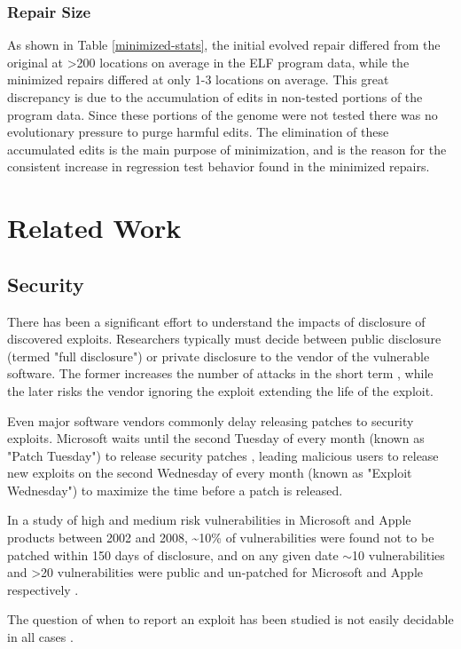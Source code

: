 \documentclass{sigcomm-alternate}
\begin{document}
\subsubsection{Repair Size}
\label{sec-4-2-3}
As shown in Table \ref{minimized-stats}, the initial evolved repair differed
from the original at >200 locations on average in the ELF program
data, while the minimized repairs differed at only 1-3 locations on
average.  This great discrepancy is due to the accumulation of edits
in non-tested portions of the program data.  Since these portions of
the genome were not tested there was no evolutionary pressure to purge
harmful edits.  The elimination of these accumulated edits is the main
purpose of minimization, and is the reason for the consistent increase
in regression test behavior found in the minimized repairs.
\section{Related Work}
\label{sec-5}
\subsection{Security}
\label{sec-5-1}
There has been a significant effort to understand the impacts of
disclosure of discovered exploits.  Researchers typically must decide
between public disclosure (termed "full disclosure") or private
disclosure to the vendor of the vulnerable software.  The former
increases the number of attacks in the short term \cite{arora2006does},
while the later risks the vendor ignoring the exploit extending the
life of the exploit.

Even major software vendors commonly delay releasing patches to
security exploits.  Microsoft waits until the second Tuesday of every
month (known as "Patch Tuesday") to release security patches
\cite{lemos2003microsoft}, leading malicious users to release new
exploits on the second Wednesday of every month (known as "Exploit
Wednesday") to maximize the time before a patch is released.

In a study of high and medium risk vulnerabilities in Microsoft and
Apple products between 2002 and 2008, \textasciitilde{}10\% of vulnerabilities were
found not to be patched within 150 days of disclosure, and on any
given date $\sim$10 vulnerabilities and >20 vulnerabilities were public and
un-patched for Microsoft and Apple respectively \cite{frei20080}.

The question of when to report an exploit has been studied is not
easily decidable in all cases \cite{arora2008optimal}.
\end{document}
